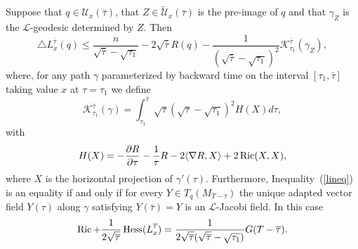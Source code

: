 \begin{proposition}\label{prop:l-length-laplacian-inequality}
\label{triL}

Suppose that $q\in {\mathcal U}_x(\bar\tau)$, that $Z\in \widetilde
{\mathcal U}_x(\bar\tau)$ is the pre-image of $q$ and that
$\gamma_Z$ is the ${\mathcal L}$-geodesic determined by $Z$. Then
\begin{equation}\label{lineq}
 \triangle L_x^{\bar\tau}(q) \leq
\frac{n}{\sqrt{\bar\tau}-\sqrt{\tau_1}} -2\sqrt{\bar\tau}R(q) -
\frac{1}{(\sqrt{\bar\tau}-\sqrt{\tau_1})^2}{\mathcal
K}_{\tau_1}^{\bar\tau}(\gamma_Z),
\end{equation}
where, for any path $\gamma$ parameterized by backward time on the
interval
 $[\tau_1,\bar\tau]$ taking
 value $x$ at $\tau=\tau_1$ we define
$${\mathcal K}_{\tau_1}^{\bar\tau}(\gamma)= \int_{\tau_1}^{\bar\tau}
\sqrt{\tau}(\sqrt{\tau}-\sqrt{\tau_1})^2H(X)d\tau,$$ with
\begin{equation}\label{Hdefnn}
H(X)= -\frac{\partial R}{\partial \tau} - \frac{1}{\tau}R - 2\langle
\nabla R,X\rangle + 2\operatorname{Ric}(X,X), \end{equation} where $X$ is the
horizontal projection of $\gamma'(\tau)$. Furthermore,
Inequality~(\ref{lineq}) is an equality if and only if for every
$Y\in T_q(M_{T-\bar\tau})$ the unique adapted vector field $Y(\tau)$
along $\gamma$ satisfying $Y(\bar\tau)=Y$ is an ${\mathcal
L}$-Jacobi field. In this case
$$\operatorname{Ric}+\frac{1}{2\sqrt{\overline\tau}}\operatorname{Hess}(L_x^{\overline\tau})
=\frac{1}{2\sqrt{\overline\tau}(\sqrt{\overline\tau}-\sqrt{\tau_1})}G(T-\overline\tau).$$
\end{proposition}


